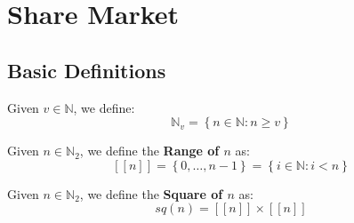 \newcommand{\R}{\mathbb{R}}
\newcommand{\N}{\mathbb{N}}
\newcommand{\Nb}[1]{\ensuremath{\N_{#1}}}
\newcommand{\Nt}{\Nb{2}}
\newcommand{\range}[1]{\ensuremath{\left[\left[ #1 \right]\right]}}
\newcommand{\Square}[1]{\ensuremath{sq({#1})}}
\newcommand{\tuple}[1]{\ensuremath{\left\langle #1 \right\rangle}}
\newcommand{\Set}[1]{\ensuremath{\left\{ #1 \right\}}}
\newcommand{\SetOf}[2]{\ensuremath{\Set{ #1 : #2}}}
\newcommand{\tupleOf}[2]{\ensuremath{\tuple{ #1 \ : \ #2}}}
\newcommand{\incl}[2]{#1 \triangleright #2}
\newcommand{\great}{Great\xspace}

\newcommand{\dref}[1]{Definition \ref{#1}\xspace}
\newcommand{\tref}[1]{Theorem \ref{#1}\xspace}

\newcommand{\op}{\ensuremath{\omega}}
\renewcommand{\b}[1]{\ensuremath{b\left( #1 \right)}}
\newcommand{\s}[1]{\ensuremath{s\left( #1 \right)}}
\newcommand{\price}[1]{\ensuremath{\rho\left( #1 \right)}}
\newcommand{\OS}{\ensuremath{\Omega_{n}}}
\newcommand{\pricep}[1]{\ensuremath{p_{\s{#1}} - p_{\b{#1}}}}

\newcommand{\sopt}{\ensuremath{S^{*}}}
\newcommand{\sop}{\ensuremath{\op^{*}}}

\chapter{Share Market}

\section{Basic Definitions}

\begin{defn}[Natural]
    Given $v \in \N$, we define:
    \begin{equation}
        \Nb{v} = \SetOf{n \in \N}{n \geqslant v}
    \end{equation}
\end{defn}

\begin{defn}[Range]
    \label{def:range}
    Given $n \in \Nt$, we define the \textbf{Range of $n$} as:
    \begin{equation}
        \range{n} = \Set{0, \dots, n - 1} = \SetOf{i \in \N}{i < n}
    \end{equation}
\end{defn}

\begin{defn}[Square]
    \label{def:square}
    Given $n \in \Nt$, we define the \textbf{Square of $n$} as:
    \begin{equation}
        \Square{n} = \range{n} \times \range{n}
    \end{equation}
\end{defn}

